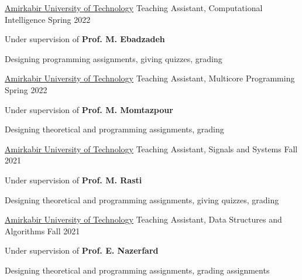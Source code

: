 
\begin{cventries}

  \cventry
    {\href{https://aut.ac.ir/}{Amirkabir University of Technology}} %
    {Teaching Assistant, Computational Intelligence} %
    {} %
    {Spring 2022} %
    {
      \begin{cvitems} %
        \item {Under supervision of \textbf{Prof. M. Ebadzadeh}}
        \item {Designing programming assignments, giving quizzes, grading}
      \end{cvitems}
    }
   
  \cventry
    {\href{https://aut.ac.ir/}{Amirkabir University of Technology}} %
    {Teaching Assistant, Multicore Programming} %
    {} %
    {Spring 2022} %
    {
      \begin{cvitems} %
        \item {Under supervision of \textbf{Prof. M. Momtazpour}}
        \item {Designing theoretical and programming assignments, grading}
      \end{cvitems}
    }
    
  \cventry
    {\href{https://aut.ac.ir/}{Amirkabir University of Technology}} %
    {Teaching Assistant, Signals and Systems} %
    {} %
    {Fall 2021} %
    {
      \begin{cvitems} %
        \item {Under supervision of \textbf{Prof. M. Rasti}}
        \item {Designing theoretical and programming assignments, giving quizzes, grading}
      \end{cvitems}
    }
   
  \cventry
    {\href{https://aut.ac.ir/}{Amirkabir University of Technology}} %
    {Teaching Assistant, Data Structures and Algorithms} %
    {} %
    {Fall 2021} %
    {
      \begin{cvitems} %
        \item {Under supervision of \textbf{Prof. E. Nazerfard}}
        \item {Designing theoretical and programming assignments, grading assignments}
      \end{cvitems}
    }


\end{cventries}
